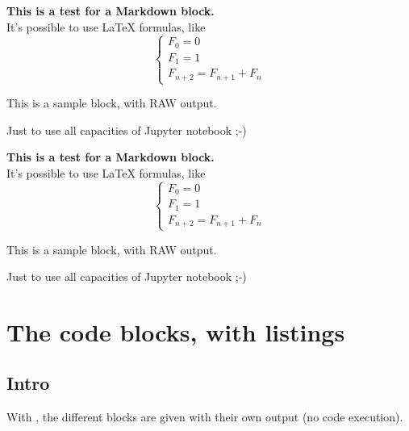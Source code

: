 \documentclass[english,11pt,a4paper]{article}
\begin{document}
\begin{codehigh}[language=latex/latex2,style/main=cyan!10,style/code=cyan!10]
\begin{NotebookMarkdown}{\linewidth}
{\Large\bfseries This is a test for a \textsf{Markdown} block.}\\
It's possible to use \LaTeX{} formulas, like %
\[
  \left\lbrace\begin{array}{l}
    F_0 = 0\\
    F_1 = 1 \\
    F_{n+2} = F_{n+1} + F_n
  \end{array}\right.
\]
\end{NotebookMarkdown}

\begin{NotebookRaw}{\linewidth}
This is a sample block, with RAW output.

Just to use all capacities of Jupyter notebook ;-)
\end{NotebookRaw}
\end{codehigh}

\begin{NotebookMarkdown}{\linewidth}
{\Large\bfseries This is a test for a \textsf{Markdown} block.}\\
It's possible to use \LaTeX{} formulas, like %
\[
	\left\lbrace\begin{array}{l}
		F_0 = 0\\
		F_1 = 1 \\
		F_{n+2} = F_{n+1} + F_n
	\end{array}\right.
\]
\end{NotebookMarkdown}

\begin{NotebookRaw}{\linewidth}
This is a sample block, with RAW output.

Just to use all capacities of Jupyter notebook ;-)
\end{NotebookRaw}

\pagebreak

\section{The code blocks, with listings}

\subsection{Intro}

With , the different blocks are given with their own output (no code execution).
\end{document}
